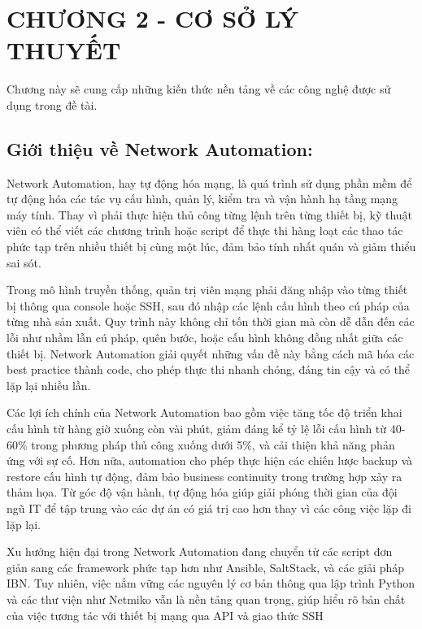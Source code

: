 \section*{CHƯƠNG 2 - CƠ SỞ LÝ THUYẾT}
	\setcounter{section}{2}
	\setcounter{subsection}{0}
	\setcounter{figure}{0}
	\setcounter{table}{0}

Chương này sẽ cung cấp những kiến thức nền tảng về các công nghệ được sử dụng trong đề tài.

\subsection{Giới thiệu về Network Automation:}
    Network Automation, hay tự động hóa mạng, là quá trình sử dụng phần mềm để tự động hóa các tác vụ cấu hình, quản lý, kiểm tra và vận hành hạ tầng mạng máy tính. Thay vì phải thực hiện thủ công từng lệnh trên từng thiết bị, kỹ thuật viên có thể viết các chương trình hoặc script để thực thi hàng loạt các thao tác phức tạp trên nhiều thiết bị cùng một lúc, đảm bảo tính nhất quán và giảm thiểu sai sót.
    
    Trong mô hình truyền thống, quản trị viên mạng phải đăng nhập vào từng thiết bị thông qua console hoặc SSH, sau đó nhập các lệnh cấu hình theo cú pháp của từng nhà sản xuất. Quy trình này không chỉ tốn thời gian mà còn dễ dẫn đến các lỗi như nhầm lẫn cú pháp, quên bước, hoặc cấu hình không đồng nhất giữa các thiết bị. Network Automation giải quyết những vấn đề này bằng cách mã hóa các best practice thành code, cho phép thực thi nhanh chóng, đáng tin cậy và có thể lặp lại nhiều lần.
    
    Các lợi ích chính của Network Automation bao gồm việc tăng tốc độ triển khai cấu hình từ hàng giờ xuống còn vài phút, giảm đáng kể tỷ lệ lỗi cấu hình từ 40-60\% trong phương pháp thủ công xuống dưới 5\%, và cải thiện khả năng phản ứng với sự cố. Hơn nữa, automation cho phép thực hiện các chiến lược backup và restore cấu hình tự động, đảm bảo business continuity trong trường hợp xảy ra thảm họa. Từ góc độ vận hành, tự động hóa giúp giải phóng thời gian của đội ngũ IT để tập trung vào các dự án có giá trị cao hơn thay vì các công việc lặp đi lặp lại.
    
    Xu hướng hiện đại trong Network Automation đang chuyển từ các script đơn giản sang các framework phức tạp hơn như Ansible, SaltStack, và các giải pháp IBN. Tuy nhiên, việc nắm vững các nguyên lý cơ bản thông qua lập trình Python và các thư viện như Netmiko vẫn là nền tảng quan trọng, giúp hiểu rõ bản chất của việc tương tác với thiết bị mạng qua API và giao thức SSH


